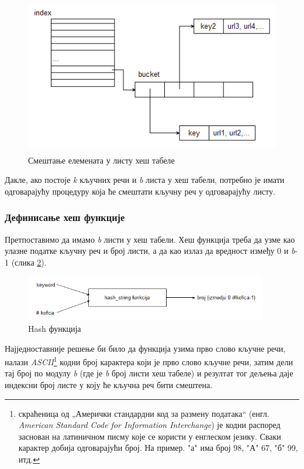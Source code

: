 \begin{figure}[here]
\centering
\includegraphics[height=257px, width=446px]{hashtab2.png}
\caption{Смештање елемената у листу хеш табеле}
\label{slike:hash2}
\end{figure}

Дакле, ако постоје \emph{k} кључних речи и \emph{b} листа у хеш табели, потребно је имати одговарајућу процедуру која ће смештати кључну реч у одговарајућу листу. \\

\subsubsection{Дефинисање хеш функције}

Претпоставимо да имамо \emph{b} листи у хеш табели. Хеш функција треба да узме као улазне податке кључну реч и број листи, а да као излаз да вредност између 0 и \emph{b}-1 (слика \ref{slike:hashstring}).

\begin{figure}[here]
\centering
\includegraphics[height=75px, width=400px]{hashstring.png}
\caption{Hash функција}
\label{slike:hashstring}
\end{figure}

Најједноставније решење би било да функција узима прво слово кључне речи, налази \emph{ASCII}\footnote{скраћеница од „Амерички стандардни код за размену података“ (енгл. \emph{American Standard Code for Information Interchange}) је кодни распоред заснован на латиничном писму које се користи у енглеском језику. Сваки карактер добија одговарајући број. На пример. "а" има број 98, "А" 67, "б" 99, итд.} кодни број карактера који је прво слово кључне речи, затим дели тај број по модулу \emph{b} (где је \emph{b} број листи хеш табеле) и резултат тог дељења даје индексни број листе у коју ће кључна реч бити смештена.

